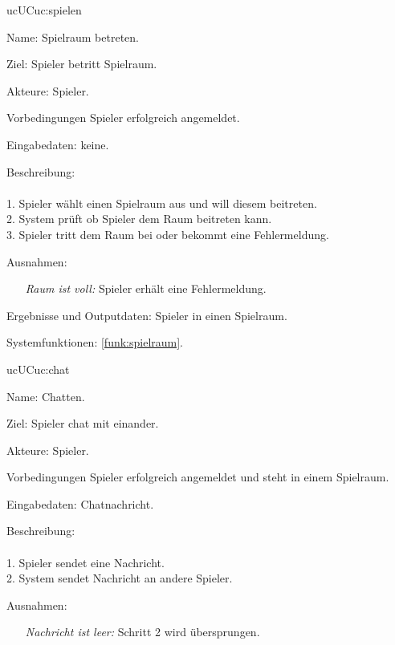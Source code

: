 \begin{description}[leftmargin=5em, style=sameline]
	\begin{lhp}{uc}{UC}{uc:spielen}
     	\item [Name:] Spielraum betreten.
    	\item [Ziel:] Spieler betritt Spielraum.
	    \item [Akteure:] Spieler.
    	\item [Vorbedingungen] Spieler erfolgreich angemeldet.
    	\item [Eingabedaten:] keine.
    	\item [Beschreibung:] \hfill\\ \hfill\\
    	1. Spieler wählt einen Spielraum aus und will diesem beitreten.\\
    	2. System prüft ob Spieler dem Raum beitreten kann.\\
    	3. Spieler tritt dem Raum bei oder bekommt eine Fehlermeldung.\\
    	\item [Ausnahmen:] \hfill
    	\begin{itemize} 
				\item[] \textit{Raum ist voll:} Spieler erhält eine Fehlermeldung.
				
			\end{itemize}
    	\item [Ergebnisse und Outputdaten:] Spieler in einen Spielraum.
     	\item [Systemfunktionen:] \ref{funk:spielraum}.
    \end{lhp} 

    \begin{lhp}{uc}{UC}{uc:chat}
    	\item [Name:] Chatten.
    	\item [Ziel:] Spieler chat mit einander.
    	\item [Akteure:] Spieler.
    	\item [Vorbedingungen] Spieler erfolgreich angemeldet und steht in einem Spielraum. 
    	\item [Eingabedaten:] Chatnachricht.
    	\item [Beschreibung:] \hfill\\ \hfill\\
    	1. Spieler sendet eine Nachricht.\\
    	2. System sendet Nachricht an andere Spieler.\\
    	\item [Ausnahmen:] \hfill
    	\begin{itemize} 
				\item[] \textit{Nachricht ist leer:} Schritt 2 wird übersprungen.
				

\end{itemize}
\end{lhp}
\end{description}

